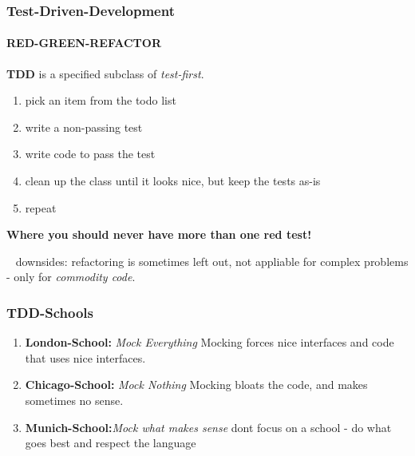 \documentclass[12pt]{beamer}
\begin{document}
	\begin{frame}
		\frametitle{Test-Driven-Development}
		\framesubtitle{RED-GREEN-REFACTOR}
		\textbf{TDD} is a specified subclass of \textit{test-first}. 
		\begin{enumerate}
			\item pick an item from the todo list
			\item write a non-passing test
			\item write code to pass the test
			\item clean up the class until it looks nice, but keep the tests as-is
			\item repeat
		\end{enumerate}
		\textbf{Where you should never have more than one red test!}
	
	
		~\newline
		downsides: refactoring is sometimes left out, not appliable for complex problems - only for \textit{commodity code}.
	\end{frame}

	\begin{frame}
		\frametitle{TDD-Schools}
		\begin{enumerate}
			\item \textbf{London-School:} \textit{Mock Everything} \newline Mocking forces nice interfaces and code that uses nice interfaces.  
			\item \textbf{Chicago-School:} \textit{Mock Nothing} 
			\newline Mocking bloats the code, and makes sometimes no sense. 
			\item \textbf{Munich-School:}\textit{Mock what makes sense} 
			\newline dont focus on a school - do what goes best and respect the language 
		\end{enumerate}
	\end{frame}
	
\end{document}
